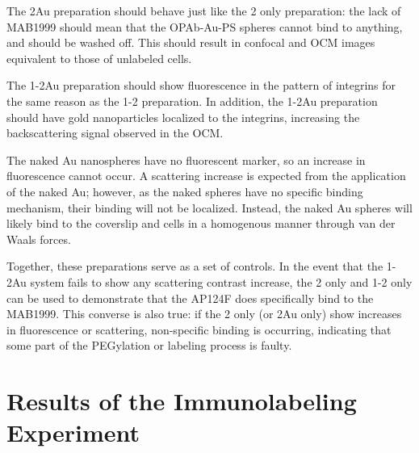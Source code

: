 The 2Au preparation should behave just like the 2 only preparation: the lack of MAB1999 should mean that the OPAb-Au-PS spheres cannot bind to anything, and should be washed off. This should result in confocal and OCM images equivalent to those of unlabeled cells.

The 1-2Au preparation should show fluorescence in the pattern of integrins for the same reason as the 1-2 preparation. In addition, the 1-2Au preparation should have gold nanoparticles localized to the integrins, increasing the backscattering signal observed in the OCM.

The naked Au nanospheres have no fluorescent marker, so an increase in fluorescence cannot occur. A scattering increase is expected from the application of the naked Au; however, as the naked spheres have no specific binding mechanism, their binding will not be localized. Instead, the naked Au spheres will likely bind to the coverslip and cells in a homogenous manner through van der Waals forces.

Together, these preparations serve as a set of controls. In the event that the 1-2Au system fails to show any scattering contrast increase, the 2 only and 1-2 only can be used to demonstrate that the AP124F does specifically bind to the MAB1999. This converse is also true: if the 2 only (or 2Au only) show increases in fluorescence or scattering, non-specific binding is occurring, indicating that some part of the PEGylation or labeling process is faulty.

\section{Results of the Immunolabeling Experiment}
\label{resultsoftheimmunolabelingexperiment}

